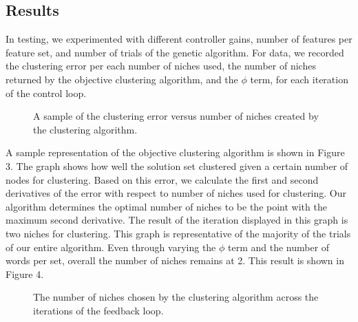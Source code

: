 \documentclass{sig-alternate}
\begin{document}
\subsection{Results}
In testing, we experimented with different controller gains, number of features per feature set, and number of trials of the genetic algorithm. For data, we recorded the clustering error per each number of niches used, the number of niches returned by the objective clustering algorithm, and the $\phi$ term, for each iteration of the control loop.
\begin{figure}[t]
\centering
{}
\caption{A sample of the clustering error versus number of niches created by the clustering algorithm.}
\label{fig:graph1}
\end{figure}
A sample representation of the objective clustering algorithm is shown in Figure 3. The graph shows how well the solution set clustered given a certain number of nodes for clustering. Based on this error, we calculate the first and second derivatives of the error with respect to number of niches used for clustering. Our algorithm determines the optimal number of niches to be the point with the maximum second derivative. The result of the iteration displayed in this graph is two niches for clustering. This graph is representative of the majority of the trials of our entire algorithm. Even through varying the $\phi$ term and the number of words per set, overall the number of niches remains at 2. This result is shown in Figure 4.
\begin{figure}[t]
\centering
{}
\caption{The number of niches chosen by the clustering algorithm across the iterations of the feedback loop.}
\label{fig:graph2}
\end{figure}
\end{document}
